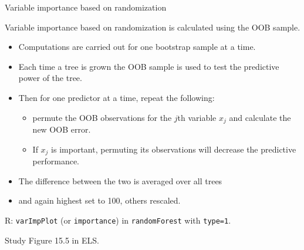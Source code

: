 \documentclass[
  ignorenonframetext,
]{beamer}
\providecommand{\tightlist}{%
  \setlength{\itemsep}{0pt}\setlength{\parskip}{0pt}}
\begin{document}
\begin{frame}[fragile]

\begin{block}{Variable importance based on randomization}

Variable importance based on randomization is calculated using the OOB
sample.

\begin{itemize}
\tightlist
\item
  Computations are carried out for one bootstrap sample at a time.
\item
  Each time a tree is grown the OOB sample is used to test the
  predictive power of the tree.
\item
  Then for one predictor at a time, repeat the following:

  \begin{itemize}
  \tightlist
  \item
    permute the OOB observations for the \(j\)th variable \(x_j\) and
    calculate the new OOB error.
  \item
    If \(x_j\) is important, permuting its observations will decrease
    the predictive performance.
  \end{itemize}
\item
  The difference between the two is averaged over all trees
\item
  and again highest set to 100, others rescaled.
\end{itemize}

R: \texttt{varImpPlot} (or \texttt{importance}) in \texttt{randomForest}
with \texttt{type=1}.

\end{block}

\end{frame}

\begin{frame}

Study Figure 15.5 in ELS.

\end{frame}
\end{document}
